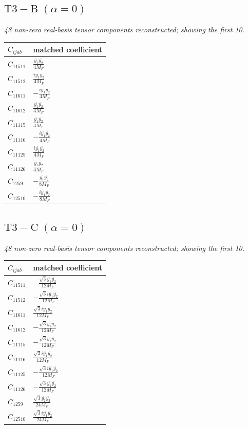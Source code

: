 \documentclass[9pt]{article}
\begin{document}
\subsection*{$ \mathrm{T3-B}\;(\alpha=0) $}
\textit{48 non-zero real-basis tensor components reconstructed; showing the first 10.}
\begin{longtable}{@{}ll@{}}
\toprule
$C_{ijab}$ & matched coefficient \\
\midrule
$C_{11511}$ & $ \frac{\overline{y_{1}} \overline{y_{2}}}{4 M_F} $ \\
$C_{11512}$ & $ \frac{i \overline{y_{1}} \overline{y_{2}}}{4 M_F} $ \\
$C_{11611}$ & $ - \frac{i \overline{y_{1}} \overline{y_{2}}}{4 M_F} $ \\
$C_{11612}$ & $ \frac{\overline{y_{1}} \overline{y_{2}}}{4 M_F} $ \\
$C_{11115}$ & $ \frac{\overline{y_{1}} \overline{y_{2}}}{4 M_F} $ \\
$C_{11116}$ & $ - \frac{i \overline{y_{1}} \overline{y_{2}}}{4 M_F} $ \\
$C_{11125}$ & $ \frac{i \overline{y_{1}} \overline{y_{2}}}{4 M_F} $ \\
$C_{11126}$ & $ \frac{\overline{y_{1}} \overline{y_{2}}}{4 M_F} $ \\
$C_{1259}$ & $ - \frac{\overline{y_{1}} \overline{y_{2}}}{8 M_F} $ \\
$C_{12510}$ & $ - \frac{i \overline{y_{1}} \overline{y_{2}}}{8 M_F} $ \\
\bottomrule
\end{longtable}
\subsection*{$ \mathrm{T3-C}\;(\alpha=0) $}
\textit{48 non-zero real-basis tensor components reconstructed; showing the first 10.}
\begin{longtable}{@{}ll@{}}
\toprule
$C_{ijab}$ & matched coefficient \\
\midrule
$C_{11511}$ & $ - \frac{\sqrt{3} \overline{y_{1}} \overline{y_{2}}}{12 M_F} $ \\
$C_{11512}$ & $ - \frac{\sqrt{3} i \overline{y_{1}} \overline{y_{2}}}{12 M_F} $ \\
$C_{11611}$ & $ \frac{\sqrt{3} i \overline{y_{1}} \overline{y_{2}}}{12 M_F} $ \\
$C_{11612}$ & $ - \frac{\sqrt{3} \overline{y_{1}} \overline{y_{2}}}{12 M_F} $ \\
$C_{11115}$ & $ - \frac{\sqrt{3} \overline{y_{1}} \overline{y_{2}}}{12 M_F} $ \\
$C_{11116}$ & $ \frac{\sqrt{3} i \overline{y_{1}} \overline{y_{2}}}{12 M_F} $ \\
$C_{11125}$ & $ - \frac{\sqrt{3} i \overline{y_{1}} \overline{y_{2}}}{12 M_F} $ \\
$C_{11126}$ & $ - \frac{\sqrt{3} \overline{y_{1}} \overline{y_{2}}}{12 M_F} $ \\
$C_{1259}$ & $ \frac{\sqrt{3} \overline{y_{1}} \overline{y_{2}}}{24 M_F} $ \\
$C_{12510}$ & $ \frac{\sqrt{3} i \overline{y_{1}} \overline{y_{2}}}{24 M_F} $ \\
\bottomrule
\end{longtable}
\end{document}
